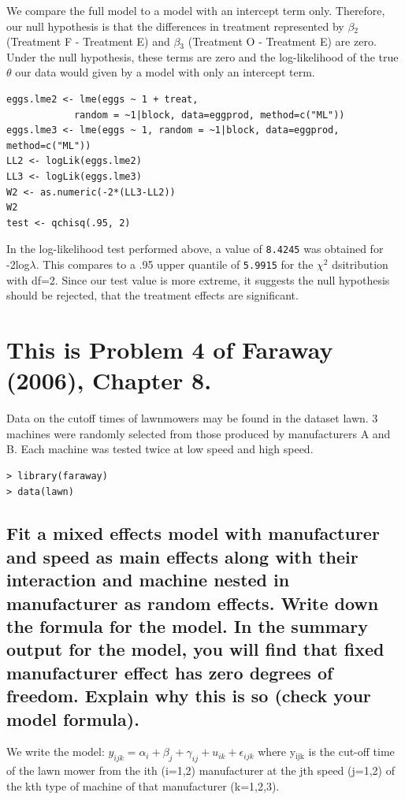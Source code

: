 \documentclass[11pt]{article}
\begin{document}
We compare the full model to a model with an intercept term only.
Therefore, our null hypothesis is that the differences in treatment 
represented by $\beta$$_2$ (Treatment F - Treatment E) and $\beta$$_3$
(Treatment O - Treatment E) are zero. Under the null hypothesis, these
terms are zero and the log-likelihood of the true $\theta$ our data
would given by a model with only an intercept term.


\begin{verbatim}
eggs.lme2 <- lme(eggs ~ 1 + treat, 
            random = ~1|block, data=eggprod, method=c("ML"))
eggs.lme3 <- lme(eggs ~ 1, random = ~1|block, data=eggprod, method=c("ML"))
LL2 <- logLik(eggs.lme2)
LL3 <- logLik(eggs.lme3)
W2 <- as.numeric(-2*(LL3-LL2))
W2
test <- qchisq(.95, 2)
\end{verbatim}

In the log-likelihood test performed above, a value of 
\texttt{8.4245} was obtained for -2log$\lambda$. This
compares to a .95 upper quantile of \texttt{5.9915} for
the $\chi$$^2$ dsitribution with df=2. Since our test value is more extreme, it
suggests the null hypothesis should be rejected, that the treatment 
effects are significant.
\section{This is Problem 4 of Faraway (2006), Chapter 8.}
\label{sec-2}


Data on the cutoff times of lawnmowers may be found in the dataset lawn. 3 machines were
randomly selected from those produced by manufacturers A and B. Each machine was tested twice
at low speed and high speed.


\begin{verbatim}
> library(faraway)
> data(lawn)
\end{verbatim}
\subsection{Fit a mixed effects model with manufacturer and speed as main effects along with their interaction and machine nested in manufacturer as random effects. Write down the formula for the model. In the summary output for the model, you will find that fixed manufacturer effect has zero degrees of freedom. Explain why this is so (check your model formula).}
\label{sec-2-1}


We write the model: $y_{ijk} = \alpha_i + \beta_j + \gamma_{ij} +
u_{ik} + \epsilon_{ijk}$ where y$_{\mathrm{ijk}}$ is the cut-off time of the
lawn mower from the ith (i=1,2) manufacturer at the jth speed (j=1,2)
of the kth type of machine of that manufacturer (k=1,2,3). 
\end{document}
